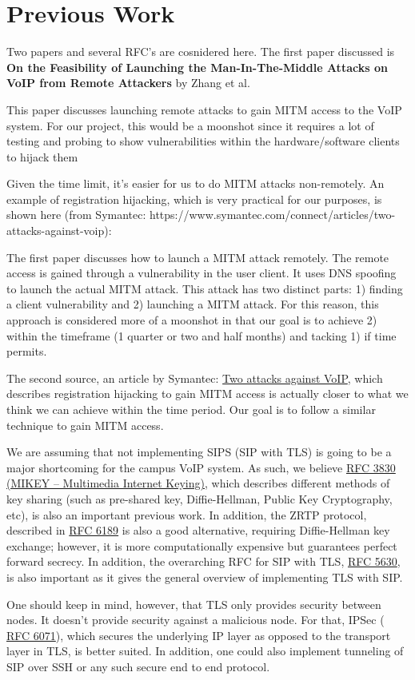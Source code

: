 \section{Previous Work}

Two papers and several RFC's are cosnidered here. The first paper discussed is \textbf{On the Feasibility of Launching the Man-In-The-Middle Attacks on VoIP from Remote Attackers} by Zhang et al.

This paper discusses launching remote attacks to gain MITM access to the VoIP system.
For our project, this would be a moonshot since it requires a lot of testing and probing to show vulnerabilities within the hardware/software clients to hijack them

Given the time limit, it’s easier for us to do MITM attacks non-remotely. An example of registration hijacking, which is very practical for our purposes, is shown here (from Symantec: https://www.symantec.com/connect/articles/two-attacks-against-voip):

The first paper discusses how to launch a MITM attack remotely. The remote access is gained through a vulnerability in the user client. It uses DNS spoofing to launch the actual MITM attack. This attack has two distinct parts: 1) finding a  client vulnerability and 2) launching a MITM attack. For this reason, this approach is considered more of a moonshot in that our goal is to achieve 2) within the timeframe (1 quarter or two and half months) and tacking 1) if time permits.

The second source, an article by Symantec: \href{https://www.symantec.com/connect/articles/two-attacks-against-voip}{Two attacks against VoIP}, which describes registration hijacking to gain MITM access is actually closer to what we think we can achieve within the time period. Our goal is to follow a similar technique to gain MITM access.



We are assuming that not implementing SIPS (SIP with TLS) is going to be a major shortcoming for the campus VoIP system. As such, we believe \href{https://tools.ietf.org/html/rfc3830}{RFC 3830 (MIKEY – Multimedia Internet Keying)}, which describes different methods of key sharing (such as pre-shared key, Diffie-Hellman, Public Key Cryptography, etc), is also an important previous work.
In addition, the ZRTP protocol, described in \href{https://tools.ietf.org/html/rfc6189}{RFC 6189} is also a good alternative, requiring Diffie-Hellman key exchange; however, it is more computationally expensive but guarantees perfect forward secrecy.
In addition, the overarching RFC for SIP with TLS, \href{https://tools.ietf.org/html/rfc5630}{RFC 5630}, is also important as it gives the general overview of implementing TLS with SIP.

One should keep in mind, however, that TLS only provides security between nodes. It doesn’t provide security against a malicious node. For that, IPSec ( \href{https://tools.ietf.org/html/rfc6071}{RFC 6071}), which secures the underlying IP layer as opposed to the transport layer in TLS, is better suited. In addition, one could also implement tunneling of SIP over SSH or any such secure end to end protocol.

